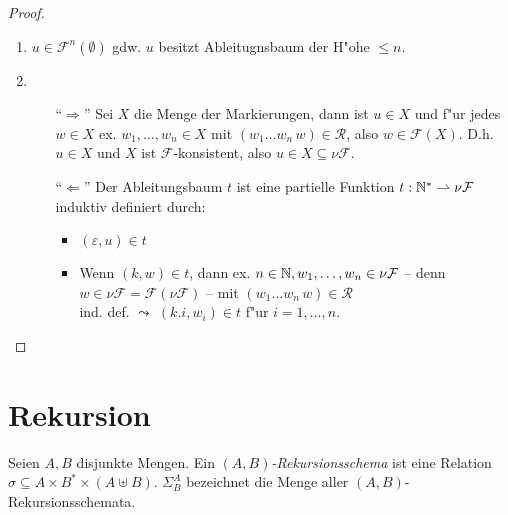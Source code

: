 \documentclass[12pt,a4paper]{article}
\begin{document}
\begin{proof} \
  \begin{enumerate}
  \item $u \in \mathcal{F}^n(\emptyset)$ gdw. $u$ besitzt Ableitugnsbaum der H"ohe $\le n$.
  \item 
    \begin{itemize}
    \item[``$\Rightarrow$'']
      Sei $X$ die Menge der Markierungen, dann ist $u \in X$ und f"ur jedes $w \in X$ ex.
      $w_1,\ldots,w_n \in X$ mit $(w_1 \ldots w_n\,w) \in \mathcal{R}$, also
      $w \in \mathcal{F}(X)$. D.h. $u \in X$ und $X$ ist $\mathcal{F}$-konsistent, also
      $u \in X \subseteq \nu \mathcal{F}$.
    \item[``$\Leftarrow$'']
      Der Ableitungsbaum $t$ ist eine partielle Funktion $t: \mathbb N^* \rightharpoonup \nu\mathcal{F}$ induktiv definiert
      durch:
      \begin{itemize}
      \item $(\varepsilon,u) \in t$
      \item Wenn $(k,w) \in t$, dann ex. $n\in\mathbb N,w_1,\ldots,w_n \in \nu\mathcal{F}$ --
        denn $w \in \nu\mathcal{F} = \mathcal{F}(\nu\mathcal{F})$ -- mit
        $(w_1 \ldots w_n\,w) \in \mathcal{R}$ \\
        ind. def. $\leadsto$ $(k.i,w_i) \in t$ f"ur $i=1,\ldots,n$.
      \end{itemize}
    \end{itemize}
  \end{enumerate}
\end{proof}


\section{Rekursion}

\begin{definition}[Rekursionsschema]
  Seien $A,B$ disjunkte Mengen. Ein \emph{$(A,B)$-Rekursionsschema} ist eine Relation
  $\sigma \subseteq A \times B^* \times (A \uplus B)$. $\Sigma^A_B$ bezeichnet die Menge
  aller $(A,B)$-Rekursionsschemata.
\end{definition}
\end{document}
